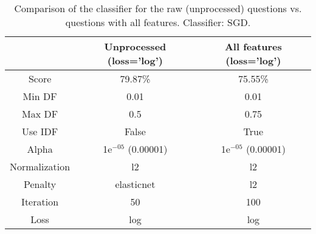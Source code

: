 \begin{table}[!h]%
	\centering
	\begin{tabular}{| c | c | c |}
		\hline
		~				& Unprocessed (loss='log')	& All features (loss='log')	\\ \hline
		Score 			& 79.87\%					& 75.55\%					\\ \hline
		Min DF 			& 0.01						& 0.01						\\ \hline
		Max DF 			& 0.5						& 0.75						\\ \hline
		Use IDF			& False						& True						\\ \hline
		Alpha 			& 1e$^{-05}$ (0.00001)		& 1e$^{-05}$ (0.00001)		\\ \hline
		Normalization 	& l2						& l2						\\ \hline		
		Penalty 		& elasticnet				& l2						\\ \hline
		Iteration 		& 50						& 100						\\ \hline
		Loss 			& log						& log						\\ \hline		
	\end{tabular}
	\caption{Comparison of the classifier for the raw (unprocessed) questions vs. questions with all features. Classifier: SGD.}
	\label{tab:unprocessed_vs_all_feature_detectors_sgd_so}
\end{table}





